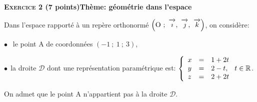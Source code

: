 \documentclass[10pt,a4paper]{article}
\newcommand{\R}{\mathbb{R}}
\newcommand{\vect}[1]{\overrightarrow{\,\mathstrut#1\,}}
\def\Oijk{$\left(\text{O}~;~\vect{\imath},~\vect{\jmath},~\vect{k}\right)$}
\begin{document}
\bigskip

\textbf{\textsc{Exercice 2}  \quad (7 points)\hfill Thème: géométrie dans l'espace}

\medskip

Dans l'espace rapporté à un repère orthonormé \Oijk, on considère:

$\bullet~~$ le point A de coordonnées $(-1~;~1~;~3)$,

$\bullet~~$la droite $\mathcal{D}$ dont une représentation paramétrique est: $\left\{\begin{array}{l c l}
x&=&1+2t\\y &=& 2 - t,\\z&=& 2+2t
\end{array}\right.  t \in \R$.

On admet que le point A n'appartient pas à la droite $\mathcal{D}$.

\medskip
\end{document}
